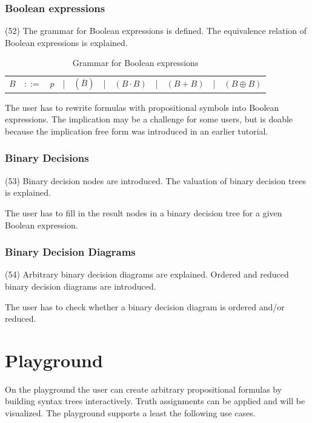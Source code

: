 \subsubsection{Boolean expressions}
\label{tut:52}

(52) The grammar for Boolean expressions is defined. 
The equivalence relation of Boolean expressions is explained.

\begin{table}[htdp]
\begin{center}
\begin{tabular}{rcccccccccc}
$B$	&$::=$	&$p$ 	
	&|		& $(\overline{B})$ 
	&|		&  $(B \cdot B)$ 
	&|		&  $(B + B)$ 
	&|		&  $(B \oplus B)$ \\
\end{tabular}
\caption{Grammar for Boolean expressions}
\label{tab:BNFGRBE}
\end{center}
\end{table}

The user has to rewrite formulas with propositional symbols into Boolean expressions.
The implication may be a challenge for some users, 
but is doable because the implication free form was introduced 
in an earlier tutorial.

\subsubsection{Binary Decisions}
\label{tut:53}

(53) Binary decision nodes are introduced. 
The valuation of binary decision trees is explained.

The user has to fill in the result nodes in a binary decision tree for a given Boolean expression.

\subsubsection{Binary Decision Diagrams}
\label{tut:54}

(54) Arbitrary binary decision diagrams are explained. 
Ordered and reduced binary decision diagrams are introduced.

The user has to check whether a binary decision diagram is ordered and/or reduced.

\section{Playground}

On the playground the user can create arbitrary propositional formulas 
by building syntax trees interactively.
Truth assignments can be applied and will be visualized.
The playground supports a least the following use cases.


